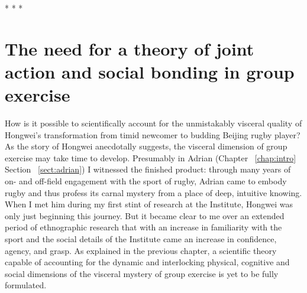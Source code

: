 \begin{CJK}{UTF8}{gbsn}
                          \begin{center}
                            * * *
                          \end{center}





\section{The need for a theory of joint action and social bonding in group exercise}

How is it possible to scientifically account for the unmistakably visceral quality of Hongwei's transformation from timid newcomer to budding Beijing rugby player?  As the story of Hongwei anecdotally suggests, the visceral dimension of group exercise may take time to develop.  Presumably in Adrian (Chapter ~\ref{chap:intro} Section ~\ref{sect:adrian}) I witnessed the finished product: through many years of on- and off-field engagement with the sport of rugby, Adrian came to embody rugby and thus profess its carnal mystery from a place of deep, intuitive knowing.  When I met him during my first stint of research at the Institute, Hongwei was only just beginning this journey.  But it became clear to me over an extended period of ethnographic research that with an increase in familiarity with the sport and the social details of the Institute came an increase in confidence, agency, and grasp.   As explained in the previous chapter, a scientific theory capable of accounting for the dynamic and interlocking physical, cognitive and social dimensions of the visceral mystery of group exercise is yet to be fully formulated.


\end{CJK}
